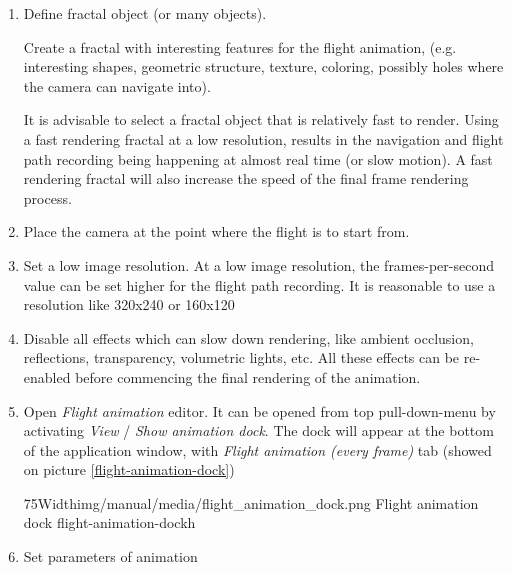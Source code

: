 \begin{enumerate}
	\item Define fractal object (or many objects). 
	
	Create a fractal with interesting features for the flight animation, (e.g. interesting shapes, geometric structure, texture, coloring, possibly holes where the camera can navigate into).
	
	It is advisable to select a fractal object that is relatively fast to render. Using a fast rendering fractal at a low resolution, results in the navigation and flight path recording being happening at almost real time (or slow motion). A fast rendering fractal will also increase the speed of the final frame rendering process.
	
	\item Place the camera at the point where the flight is to start from.
			
	\item Set a low image resolution. At a low image resolution, the frames-per-second value can be set higher for the flight path recording. It is reasonable to use a resolution like 320x240 or 160x120
	
	\item Disable all effects which can slow down rendering, like ambient occlusion, reflections, transparency, volumetric lights, etc. All these effects can be re-enabled before commencing the final rendering of the animation.
	
	\item Open \emph{Flight animation} editor. It can be opened from top pull-down-menu by activating \emph{View} / \emph{Show animation dock}. The dock will appear at the bottom of the application window, with \emph{Flight animation (every frame)} tab (showed on picture \ref{flight-animation-dock})
	
	\simpleImageWithCaption75Width{img/manual/media/flight_animation_dock.png}
	{Flight animation dock}
	{flight-animation-dock}{h}
	
	\item Set parameters of animation
	

\end{enumerate}
